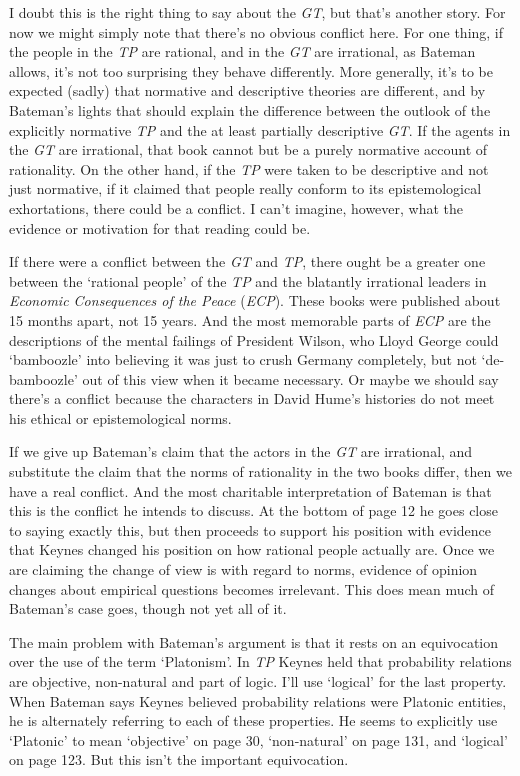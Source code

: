 \documentclass[noflushend]{philosophersimprint}
\begin{document}
I doubt this is the right thing to say about the \emph{GT}, but that's
another story. For now we might simply note that there's no obvious
conflict here. For one thing, if the people in the \emph{TP} are
rational, and in the \emph{GT} are irrational, as Bateman allows, it's
not too surprising they behave differently. More generally, it's to be
expected (sadly) that normative and descriptive theories are different,
and by Bateman's lights that should explain the difference between the
outlook of the explicitly normative \emph{TP} and the at least partially
descriptive \emph{GT}. If the agents in the \emph{GT} are irrational,
that book cannot but be a purely normative account of rationality. On
the other hand, if the \emph{TP} were taken to be descriptive and not
just normative, if it claimed that people really conform to its
epistemological exhortations, there could be a conflict. I can't
imagine, however, what the evidence or motivation for that reading could
be.

If there were a conflict between the \emph{GT} and \emph{TP}, there
ought be a greater one between the `rational people' of the \emph{TP}
and the blatantly irrational leaders in \emph{Economic Consequences of
the Peace} (\emph{ECP}). These books were published about 15 months
apart, not 15 years. And the most memorable parts of \emph{ECP} are the
descriptions of the mental failings of President Wilson, who Lloyd
George could `bamboozle' into believing it was just to crush Germany
completely, but not `de-bamboozle' out of this view when it became
necessary. Or maybe we should say there's a conflict because the
characters in David Hume's histories do not meet his ethical or
epistemological norms.

If we give up Bateman's claim that the actors in the \emph{GT} are
irrational, and substitute the claim that the norms of rationality in
the two books differ, then we have a real conflict. And the most
charitable interpretation of Bateman is that this is the conflict he
intends to discuss. At the bottom of page 12 he goes close to saying
exactly this, but then proceeds to support his position with evidence
that Keynes changed his position on how rational people actually are.
Once we are claiming the change of view is with regard to norms,
evidence of opinion changes about empirical questions becomes
irrelevant. This does mean much of Bateman's case goes, though not yet
all of it.

The main problem with Bateman's argument is that it rests on an
equivocation over the use of the term `Platonism'. In \emph{TP} Keynes
held that probability relations are objective, non-natural and part of
logic. I'll use `logical' for the last property. When Bateman says
Keynes believed probability relations were Platonic entities, he is
alternately referring to each of these properties. He seems to
explicitly use `Platonic' to mean `objective' on page 30, `non-natural'
on page 131, and `logical' on page 123. But this isn't the important
equivocation.
\end{document}
